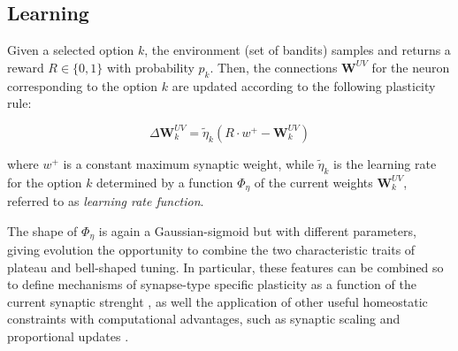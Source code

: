 

\subsection{Learning}
Given a selected option $k$, the environment (set of bandits) samples and returns a reward $R\in \{0, 1\}$ with probability $p_{k}$.
Then, the connections $\textbf{W}^{UV}$ for the neuron corresponding to the option $k$ are updated according to the following plasticity rule:

\begin{equation}
    \Delta \textbf{W}^{UV}_{k} = \tilde{\eta}_{k} \left(R\cdot w^{+}- \textbf{W}^{UV}_{k}\right)
\end{equation}

\noindent where $w^{+}$ is a constant maximum synaptic weight, while $\tilde{\eta}_{k}$ is the learning rate for the option $k$ determined by a function $\Phi_{\eta}$ of the current weights $\textbf{W}^{UV}_{k}$, referred to as \textit{learning rate function}.

The shape of $\Phi_{\eta}$ is again a Gaussian-sigmoid but with different parameters, giving evolution the opportunity to combine the two characteristic traits of plateau and bell-shaped tuning.
In particular, these features can be combined so to define mechanisms of synapse-type specific plasticity as a function of the current synaptic strenght \cite{larsenSynapsetypespecificPlasticityLocal2015}, as well the application of other useful homeostatic constraints with computational advantages, such as synaptic scaling and proportional updates \cite{citriSynapticPlasticityMultiple2008, kennedySynapticSignalingLearning2016, samavatSynapticInformationStorage2024}.



